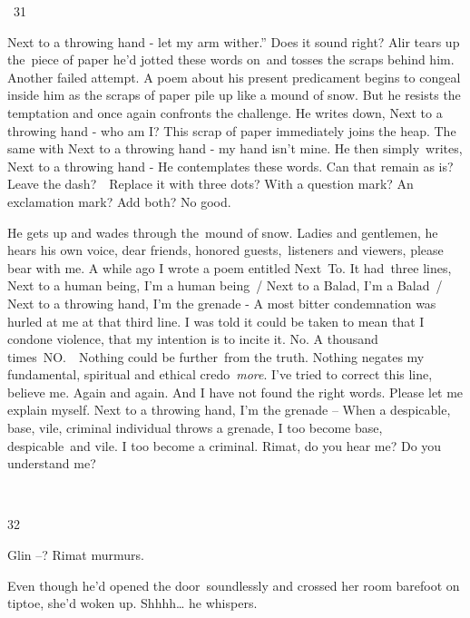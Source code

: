 \documentclass[letterpaper]{article}
\begin{document}
\bigskip

~31 

{\textquotedbl}Next to a throwing hand - let my arm wither.'' Does it sound right? Alir tears up the~piece of paper he'd
jotted these words on\textcolor[rgb]{0.0,0.4392157,0.7529412}{\ }and tosses the scraps behind him. Another failed
attempt.  A poem about his present predicament begins to congeal inside him as the scraps of paper pile up like a mound
of snow. But he resists the temptation and once again confronts the challenge. He writes down, {\textquotedbl}Next to a
throwing hand - who am I?{\textquotedbl} This scrap of paper immediately joins the heap. The same with
{\textquotedbl}Next to a throwing hand - my hand isn't mine.{\textquotedbl} He then
simply\textcolor[rgb]{0.0,0.4392157,0.7529412}{\ }writes, {\textquotedbl}Next to a throwing hand -{\textquotedbl} He
contemplates these words. Can that remain as is? Leave the dash?\ \ Replace it with three dots? With a question mark?
An exclamation mark? Add both? No good. 

He gets up and wades through the\ mound of snow. {\textquotedbl}Ladies and gentlemen,{\textquotedbl} he hears his own
voice, {\textquotedbl}dear friends, honored guests,~listeners and viewers, please bear with me. A while ago I wrote a
poem entitled {\textquotedbl}Next\ To{\textquotedbl}. It had~three lines, {\textquotedbl}Next to a human being, I'm a
human being~/ Next to a Balad, I'm a Balad~/ Next to a throwing hand, I'm the grenade -{\textquotedbl} A most bitter
condemnation was hurled at me at that  third line. I was told it could be taken to mean that I condone violence, that
my intention is to incite it. No. A thousand times~NO.\ \ Nothing could be further~from the truth. Nothing negates my
fundamental, spiritual and ethical credo\ \textit{more}. I've tried to correct this line, believe me. Again and again.
And I have not found the right words. Please let me explain myself. {\textquotedbl}Next to a throwing hand, I'm the
grenade --{\textquotedbl} When a despicable, base, vile, criminal individual throws a grenade, I too become base,
despicable\textcolor[rgb]{0.0,0.4392157,0.7529412}{\ }and vile. I too become a criminal. Rimat, do you hear me? Do you
understand me?

~

32\ 

{\textquotedbl}Glin --?{\textquotedbl} Rimat murmurs. 

Even though he'd opened the door\ soundlessly and crossed her room barefoot on tiptoe, she'd woken up.
{\textquotedbl}Shhhh{\dots}{\textquotedbl} he whispers. 
\end{document}
